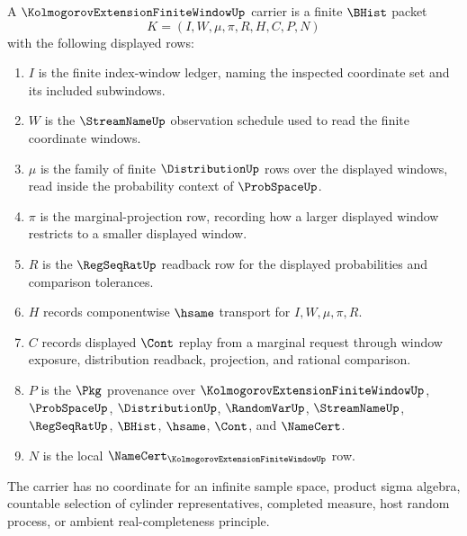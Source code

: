 \begin{definition}
\label{def:kolmogorov-extension-finite-window-carrier}
A $\KolmogorovExtensionFiniteWindowUp$ carrier is a finite $\BHist$ packet
$$
K=(I,W,\mu,\pi,R,H,C,P,N)
$$
with the following displayed rows:
\begin{enumerate}
\item $I$ is the finite index-window ledger, naming the inspected coordinate set and its included subwindows.
\item $W$ is the $\StreamNameUp$ observation schedule used to read the finite coordinate windows.
\item $\mu$ is the family of finite $\DistributionUp$ rows over the displayed windows, read inside the probability context of $\ProbSpaceUp$.
\item $\pi$ is the marginal-projection row, recording how a larger displayed window restricts to a smaller displayed window.
\item $R$ is the $\RegSeqRatUp$ readback row for the displayed probabilities and comparison tolerances.
\item $H$ records componentwise $\hsame$ transport for $I,W,\mu,\pi,R$.
\item $C$ records displayed $\Cont$ replay from a marginal request through window exposure, distribution readback, projection, and rational comparison.
\item $P$ is the $\Pkg$ provenance over $\KolmogorovExtensionFiniteWindowUp$, $\ProbSpaceUp$, $\DistributionUp$, $\RandomVarUp$, $\StreamNameUp$, $\RegSeqRatUp$, $\BHist$, $\hsame$, $\Cont$, and $\NameCert$.
\item $N$ is the local $\NameCert_{\KolmogorovExtensionFiniteWindowUp}$ row.
\end{enumerate}
The carrier has no coordinate for an infinite sample space, product sigma algebra, countable selection of cylinder representatives, completed measure, host random process, or ambient real-completeness principle.
\end{definition}

